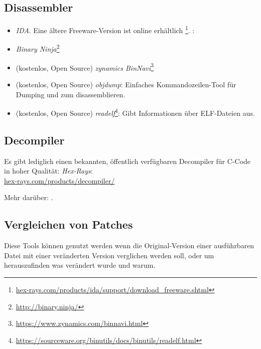 \subsection{Disassembler}


\begin{itemize}
\item \emph{IDA}. Eine ältere Freeware-Version ist online erhältlich
\footnote{\href{http://go.yurichev.com/17031}{hex-rays.com/products/ida/support/download\_freeware.shtml}}.
\ShortHotKeyCheatsheet: 


\item \emph{Binary Ninja}\footnote{\url{http://binary.ninja/}}

\item (kostenlos, Open Source) \emph{zynamics BinNavi}\footnote{\url{https://www.zynamics.com/binnavi.html}}

\item (kostenlos, Open Source) \emph{objdump}: Einfaches Kommandozeilen-Tool für Dumping und zum disassemblieren.

\item (kostenlos, Open Source) \emph{readelf}\footnote{\url{https://sourceware.org/binutils/docs/binutils/readelf.html}}:
Gibt Informationen über ELF-Dateien aus.
\end{itemize}

\subsection{Decompiler}

Es gibt lediglich einen bekannten, öffentlich verfügbaren Decompiler für C-Code in
hoher Qualität: \emph{Hex-Rays}:\\
\href{http://go.yurichev.com/17033}{hex-rays.com/products/decompiler/}

Mehr darüber: .

\subsection{Vergleichen von Patches}

Diese Tools können genutzt werden wenn die Original-Version einer ausführbaren Datei
mit einer veränderten Version verglichen werden soll, oder um herauszufinden was
verändert wurde und warum.

